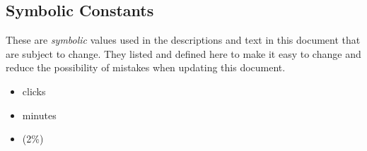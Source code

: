 \documentclass[12pt, titlepage]{article}
\begin{document}
\subsection{Symbolic Constants} \label{secsymbolic_constants}
These are \textit{symbolic} values used in the descriptions and text in this document that are 
subject to change. They listed and defined here to make it easy to change and reduce the
possibility of mistakes when updating this document.
\begin{itemize}
  \item {} clicks
  \item {} minutes
  \item {} (2\%)
\end{itemize}
\end{document}
